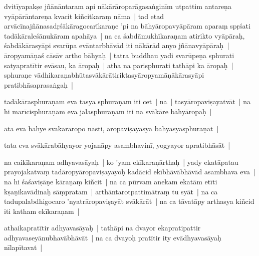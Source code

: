 \documentclass[article,12pt,a4paper]{memoir}%
\newcounter{parCount}
\begin{document}
	  
	  \pstart \leavevmode%
	\label{thakur75-134.8}dvitīyapakṣe jñānāntaram api nākārāroparāgasaṅginīm utpattim antareṇa vyāpārāntareṇa kvacit kiñcitkaraṃ nāma | tad etad arvācīnajñānasadṛśākāragocarīkaraṇe 'pi na bāhyāropavyāpāram aparaṃ spṛśati tadākāraleśānukāram apahāya | na ca śabdāmukhīkaraṇam atirikto vyāpāraḥ, śabdākārasyāpi svarūpa evāntarbhāvād iti nākārād anyo jñānavyāpāraḥ | āropyamāṇaś cāsāv artho bāhyaḥ | tatra buddhau yadi svarūpeṇa sphurati satyapratītir evāsau, ka āropaḥ | atha na parisphurati tathāpi ka āropaḥ | sphuraṇe vādhikaraṇabhūtasvākārātiriktasyāropyamāṇākārasyāpi pratibhāsaprasaṅgaḥ |
	{}
	\pend%
      

	  
	  \pstart \leavevmode%
	\label{thakur75-134.16}tadākārasphuraṇam eva tasya sphuraṇam iti cet | na | tasyāropaviṣayatvāt | na hi marīcisphuraṇam eva jalasphuraṇam iti na svākāre bāhyāropaḥ |
	{}
	\pend%
      

	  
	  \pstart \leavevmode%
	ata eva bāhye svākārāropo nāsti, āropaviṣayasya bāhyasyāsphuraṇāt |
	{}
	\pend%
      

	  
	  \pstart \leavevmode%
	tata eva svākārabāhyayor yojanāpy asambhavinī, yogyayor apratibhāsāt |
	{}
	\pend%
      

	  
	  \pstart \leavevmode%
	na caikīkaraṇam adhyavasāyaḥ | ko 'yam ekīkaraṇārthaḥ | yady ekatāpatau prayojakatvaṃ tadāropyāropaviṣayayoḥ kadācid ekībhāvābhāvād asambhava eva | na hi śaśaviṣāṇe kāraṇaṃ kiñcit | na ca pūrvam anekam ekatām etīti kṣaṇikavādinaḥ sāṃpratam | arthāntarotpattimātraṃ tu syāt | na ca tadupalabdhigocaro 'nyatrāropaviṣayāt svākārāt | na ca tāvatāpy arthasya kiñcid iti katham ekīkaraṇam |
	{}
	\pend%
      

	  
	  \pstart \leavevmode%
	\label{thakur75-134.25}athaikapratītir adhyavasāyaḥ | tathāpi na dvayor ekapratipattir adhyavaseyānubhavābhāvāt | na ca dvayoḥ pratītir ity evādhyavasāyaḥ nīlapītavat | \label{thakur75-134.27}
	{}
	\pend%
      
\end{document}
